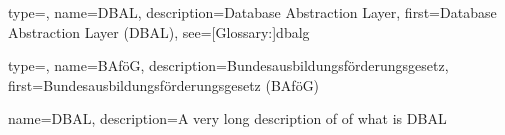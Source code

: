 {
	type=\acronymtype,
	name={DBAL},
	description={Database Abstraction Layer},
	first={Database Abstraction Layer (DBAL)},
	see=[Glossary:]{dbalg}
}

{
	type=\acronymtype,
	name={BAföG},
	description={Bundesausbildungsförderungsgesetz},
	first={Bundesausbildungsförderungsgesetz (BAföG)}
}

{
	name={DBAL},
	description={A very long description of of what is DBAL}
}